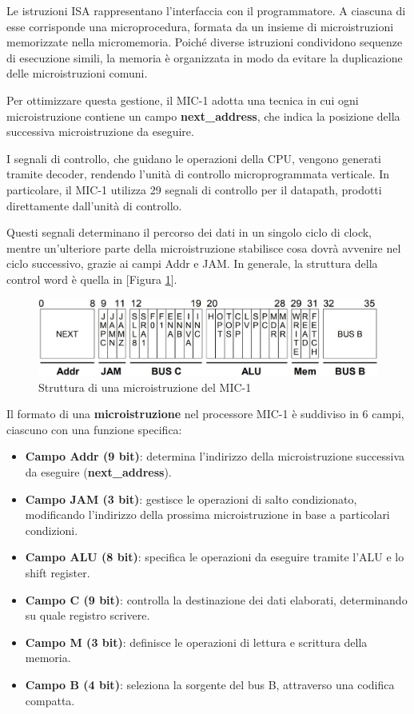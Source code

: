 Le istruzioni ISA rappresentano l'interfaccia con il programmatore. A ciascuna di esse corrisponde una microprocedura, formata da un insieme di microistruzioni memorizzate nella micromemoria. Poiché diverse istruzioni condividono sequenze di esecuzione simili, la memoria è organizzata in modo da evitare la duplicazione delle microistruzioni comuni.

Per ottimizzare questa gestione, il MIC-1 adotta una tecnica in cui ogni microistruzione contiene un campo \textbf{next\_address}, che indica la posizione della successiva microistruzione da eseguire.

I segnali di controllo, che guidano le operazioni della CPU, vengono generati tramite decoder, rendendo l'unità di controllo microprogrammata verticale. In particolare, il MIC-1 utilizza 29 segnali di controllo per il datapath, prodotti direttamente dall'unità di controllo.

Questi segnali determinano il percorso dei dati in un singolo ciclo di clock, mentre un'ulteriore parte della microistruzione stabilisce cosa dovrà avvenire nel ciclo successivo, grazie ai campi Addr e JAM. In generale, la struttura della control word è quella in [Figura \ref{fig:mic1_microinstruction}].

\begin{figure}[h]
    \centering
    \includegraphics[width=0.6\linewidth]{img/mic1_microinstruction.jpg}
    \caption{Struttura di una microistruzione del MIC-1}
    \label{fig:mic1_microinstruction}
\end{figure}

Il formato di una \textbf{microistruzione} nel processore MIC-1 è suddiviso in 6 campi, ciascuno con una funzione specifica:
\begin{itemize}
    \item \textbf{Campo Addr (9 bit)}: determina l'indirizzo della microistruzione successiva da eseguire (\textbf{next\_address}).
    \item \textbf{Campo JAM (3 bit)}: gestisce le operazioni di salto condizionato, modificando l'indirizzo della prossima microistruzione in base a particolari condizioni.
    \item \textbf{Campo ALU (8 bit)}: specifica le operazioni da eseguire tramite l'ALU e lo shift register.
    \item \textbf{Campo C (9 bit)}: controlla la destinazione dei dati elaborati, determinando su quale registro scrivere.
    \item \textbf{Campo M (3 bit)}: definisce le operazioni di lettura e scrittura della memoria.
    \item \textbf{Campo B (4 bit)}: seleziona la sorgente del bus B, attraverso una codifica compatta.
\end{itemize}

